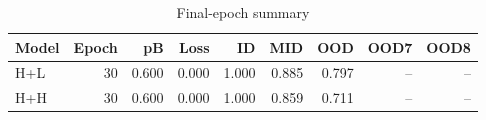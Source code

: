 \begin{table}[t]
\centering
\begin{tabular}{lrrrrrrrr}
\hline
Model & Epoch & pB & Loss & ID & MID & OOD & OOD7 & OOD8 \\
\hline
H+L & 30 & 0.600 & 0.000 & 1.000 & 0.885 & 0.797 & -- & -- \\
H+H & 30 & 0.600 & 0.000 & 1.000 & 0.859 & 0.711 & -- & -- \\
\hline
\end{tabular}
\caption{Final-epoch summary}
\label{tab:final}
\end{table}

